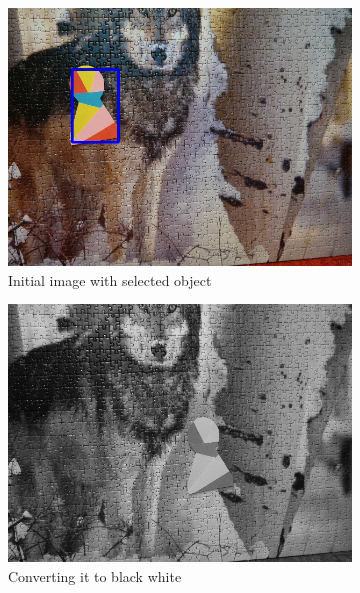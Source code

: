 \begin{figure}
  \centering
  \begin{subfigure}[t]{0.48\linewidth}
    \includegraphics[width=\linewidth]{img/pattern_matching/initial.jpg}
    \caption{Initial image with selected object}
  \end{subfigure}
  \begin{subfigure}[t]{0.48\linewidth}
    \includegraphics[width=\linewidth]{img/pattern_matching/blackwhite.jpg}
    \caption{Converting it to black white}
  \end{subfigure}\\
  \begin{subfigure}[t]{0.48\linewidth}
    \vspace{-52mm}%

\end{subfigure}
\end{figure}
